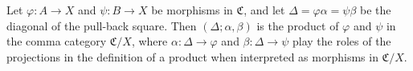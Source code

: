 Let $\varphi: A \to X$ and $\psi: B \to X$ be morphisms in $\mathfrak{C}$, and let $\Delta = \varphi \alpha = \psi \beta$ be the diagonal of the pull-back square. Then $(\Delta; \alpha, \beta)$ is the product of $\varphi$ and $\psi$ in the comma category $\mathfrak{C}/X$, where $\alpha: \Delta \to \varphi$ and $\beta: \Delta \to \psi$ play the roles of the projections in the definition of a product when interpreted as morphisms in $\mathfrak{C}/X$.
